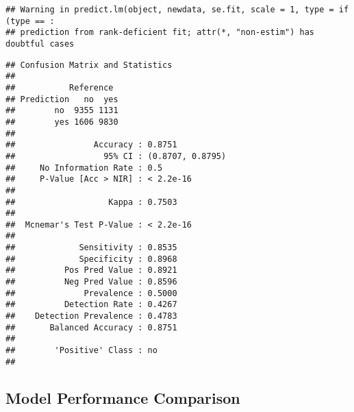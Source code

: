 \documentclass[
]{article}
\newenvironment{Shaded}{\begin{snugshade}}{\end{snugshade}}
\newcommand{\AttributeTok}[1]{\textcolor[rgb]{0.13,0.29,0.53}{#1}}
\newcommand{\FloatTok}[1]{\textcolor[rgb]{0.00,0.00,0.81}{#1}}
\newcommand{\FunctionTok}[1]{\textcolor[rgb]{0.13,0.29,0.53}{\textbf{#1}}}
\newcommand{\NormalTok}[1]{#1}
\newcommand{\OtherTok}[1]{\textcolor[rgb]{0.56,0.35,0.01}{#1}}
\newcommand{\SpecialCharTok}[1]{\textcolor[rgb]{0.81,0.36,0.00}{\textbf{#1}}}
\newcommand{\StringTok}[1]{\textcolor[rgb]{0.31,0.60,0.02}{#1}}
\begin{document}
\begin{verbatim}
## Warning in predict.lm(object, newdata, se.fit, scale = 1, type = if (type == :
## prediction from rank-deficient fit; attr(*, "non-estim") has doubtful cases
\end{verbatim}

\begin{Shaded}
\end{Shaded}

\begin{verbatim}
## Confusion Matrix and Statistics
## 
##           Reference
## Prediction   no  yes
##        no  9355 1131
##        yes 1606 9830
##                                           
##                Accuracy : 0.8751          
##                  95% CI : (0.8707, 0.8795)
##     No Information Rate : 0.5             
##     P-Value [Acc > NIR] : < 2.2e-16       
##                                           
##                   Kappa : 0.7503          
##                                           
##  Mcnemar's Test P-Value : < 2.2e-16       
##                                           
##             Sensitivity : 0.8535          
##             Specificity : 0.8968          
##          Pos Pred Value : 0.8921          
##          Neg Pred Value : 0.8596          
##              Prevalence : 0.5000          
##          Detection Rate : 0.4267          
##    Detection Prevalence : 0.4783          
##       Balanced Accuracy : 0.8751          
##                                           
##        'Positive' Class : no              
## 
\end{verbatim}

\subsection{Model Performance
Comparison}\label{model-performance-comparison}
\end{document}
